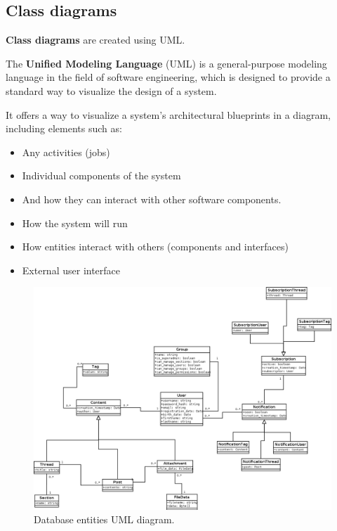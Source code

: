 \documentclass[12pt]{report}
\renewcommand\emph{\textbf}
\begin{document}
                    \newpage
                    \newpage

                \subsection{Class diagrams}

                    \emph{Class diagrams} are created using UML.

                    The \emph{Unified Modeling Language} (UML) is a general-purpose modeling language in the field of software engineering, which is designed to provide a standard way to visualize the design of a system.
                    
                    It offers a way to visualize a system's architectural blueprints in a diagram, including elements such as:

                    \begin{itemize}
                        \item Any activities (jobs)
                        \item Individual components of the system
                        \item And how they can interact with other software components.
                        \item How the system will run
                        \item How entities interact with others (components and interfaces)
                        \item External user interface
                    \end{itemize}
                    
                    \begin{figure}[H]
                    \caption{Database entities UML diagram.}
                    \centering
                    \includegraphics[width=1\textwidth]{uml/umldb}
                    \end{figure}
\end{document}
